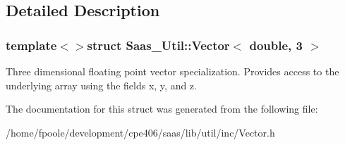 \subsection{Detailed Description}
\subsubsection*{template$<$$>$struct Saas\+\_\+\+Util\+::\+Vector$<$ double, 3 $>$}

Three dimensional floating point vector specialization. Provides access to the underlying array using the fields x, y, and z. 

The documentation for this struct was generated from the following file\+:\begin{DoxyCompactItemize}
\item 
/home/fpoole/development/cpe406/saas/lib/util/inc/Vector.\+h\end{DoxyCompactItemize}

